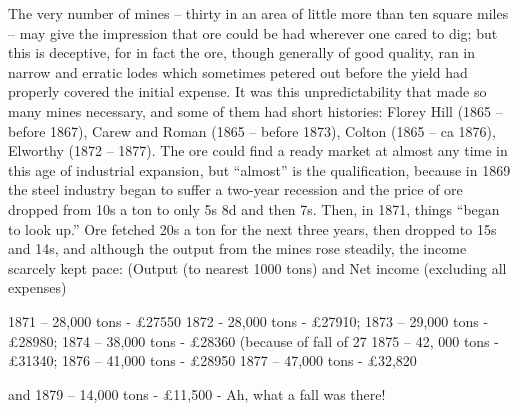 \documentclass[10pt,a4paper]{article}
\begin{document}
  The very number of mines – thirty in an area of little more than ten square miles – may give the impression that ore could be had wherever one cared to dig; but this is deceptive, for in fact the ore, though generally of good quality, ran in narrow and erratic lodes which sometimes petered out before the yield had properly covered the initial expense. It was this unpredictability that made so many mines necessary, and some of them had short histories: Florey Hill (1865 – before 1867), Carew and Roman (1865 – before 1873), Colton (1865 – ca 1876), Elworthy (1872 – 1877).  The ore could find a ready market at almost any time in this age of industrial expansion, but “almost” is the qualification, because in 1869 the steel industry began  to suffer a two-year recession and the price of ore dropped from 10s a ton to only 5s 8d  and then 7s.  Then, in 1871, things “began to look up.” Ore fetched 20s a ton for the next three years, then dropped to 15s and 14s, and although the output from the mines rose steadily, the income scarcely kept pace: 
(Output (to nearest 1000 tons) and Net income (excluding all expenses)

        1871 – 28,000 tons -     £27550
        1872 - 28,000  tons -      £27910;
        1873 – 29,000 tons -      £28980;
        1874 – 38,000 tons -     £28360  (because of fall of 27%
        1875 – 42, 000 tons -    £31340;
        1876 – 41,000 tons -     £28950 
        1877 – 47,000 tons -     £32,820 

 and 1879 – 14,000 tons -    £11,500 -  Ah, what a fall was there! 
\end{document}
